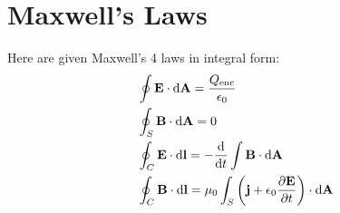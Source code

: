 \documentclass{book}
\begin{document}
\chapter{Maxwell's Laws}
Here are given Maxwell's 4 laws in integral form:
\begin{align}
	&\oint \vb{E}\cdot\dd{\vb{A}} = \frac{Q_{\text{enc}}}{\epsilon_0} \\
	&\oint_S \vb{B}\cdot\dd{\vb{A}} = 0 \\
	&\oint_C \vb{E}\cdot\dd{\vb{l}} = -\dv{}{t}\int\vb{B}\cdot\dd{\vb{A}} \\
	&\oint_C\vb{B}\cdot\dd{\vb{l}} = \mu_0\int_S\left(\vb{j} + \epsilon_0\pdv{\vb{E}}{t}\right)\cdot \dd{\vb{A}}
\end{align}
\end{document}
